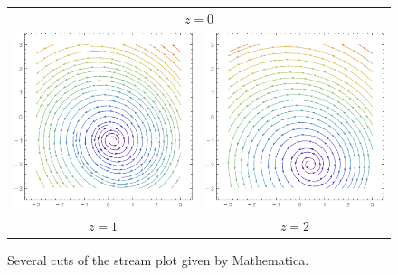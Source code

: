 \documentclass{article}
\begin{document}
\begin{figure}[h]
\begin{tabular}{c c}
		\multicolumn{2}{c}{$z=0$}\\
		\includegraphics[scale=0.5]{spz1}  & \includegraphics[scale=0.5]{spz2}  \\
		$z=1$                              & $z=2$
	\end{tabular}
	\caption{Several cuts of the stream plot given by Mathematica.}
	\label{fig:plot_cuts}
\end{figure}
\end{document}
